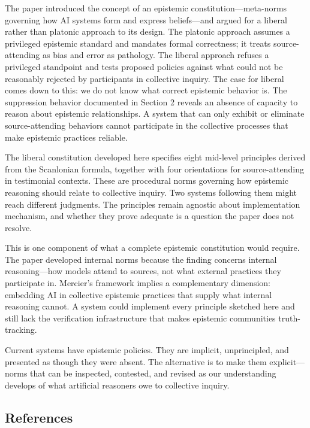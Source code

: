 The paper introduced the concept of an epistemic
constitution---meta-norms governing how AI systems form and express
beliefs---and argued for a liberal rather than platonic approach to its
design. The platonic approach assumes a privileged epistemic standard
and mandates formal correctness; it treats source-attending as bias and
error as pathology. The liberal approach refuses a privileged standpoint
and tests proposed policies against what could not be reasonably
rejected by participants in collective inquiry. The case for liberal
comes down to this: we do not know what correct epistemic behavior is.
The suppression behavior documented in Section 2 reveals an absence of
capacity to reason about epistemic relationships. A system that can only
exhibit or eliminate source-attending behaviors cannot participate in
the collective processes that make epistemic practices reliable.

The liberal constitution developed here specifies eight mid-level
principles derived from the Scanlonian formula, together with four
orientations for source-attending in testimonial contexts. These are
procedural norms governing how epistemic reasoning should relate to
collective inquiry. Two systems following them might reach different
judgments. The principles remain agnostic about implementation
mechanism, and whether they prove adequate is a question the paper does
not resolve.

This is one component of what a complete epistemic constitution would
require. The paper developed internal norms because the finding concerns
internal reasoning---how models attend to sources, not what external
practices they participate in. Mercier's framework implies a
complementary dimension: embedding AI in collective epistemic practices
that supply what internal reasoning cannot. A system could implement
every principle sketched here and still lack the verification
infrastructure that makes epistemic communities truth-tracking.

Current systems have epistemic policies. They are implicit,
unprincipled, and presented as though they were absent. The alternative
is to make them explicit---norms that can be inspected, contested, and
revised as our understanding develops of what artificial reasoners owe
to collective inquiry.

\subsection{References}\label{references}

